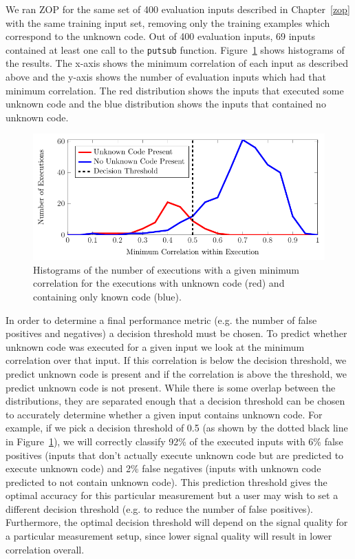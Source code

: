 We ran ZOP for the same set of 400 evaluation inputs described in Chapter~\ref{zop} with the same training input set, removing only the training examples which correspond to the unknown code. Out of 400 evaluation inputs, 69 inputs contained at least one call to the \texttt{putsub} function. Figure~\ref{malware_detect} shows histograms of the results. The x-axis shows the minimum correlation of each input as described above and the y-axis shows the number of evaluation inputs which had that minimum correlation. The red distribution shows the inputs that executed some unknown code and the blue distribution shows the inputs that contained no unknown code. 

\begin{figure}[hbt]
\includegraphics[width=5in]{malware_detect}
\caption{Histograms of the number of executions with a given minimum correlation for the executions with unknown code (red) and containing only known code (blue).}
\label{malware_detect}
\end{figure}

In order to determine a final performance metric (e.g. the number of false positives and negatives) a decision threshold must be chosen. To predict whether unknown code was executed for a given input we look at the minimum correlation over that input. If this correlation is below the decision threshold, we predict unknown code is present and if the correlation is above the threshold, we predict unknown code is not present. While there is some overlap between the distributions, they are separated enough that a decision threshold can be chosen to accurately determine whether a given input contains unknown code. For example, if we pick a decision threshold of 0.5 (as shown by the dotted black line in Figure~\ref{malware_detect}), we will correctly classify 92\% of the executed inputs with 6\% false positives (inputs that don't actually execute unknown code but are predicted to execute unknown code) and 2\% false negatives (inputs with unknown code predicted to not contain unknown code). This prediction threshold gives the optimal accuracy for this particular measurement but a user may wish to set a different decision threshold (e.g. to reduce the number of false positives). Furthermore, the optimal decision threshold will depend on the signal quality for a particular measurement setup, since lower signal quality will result in lower correlation overall.


